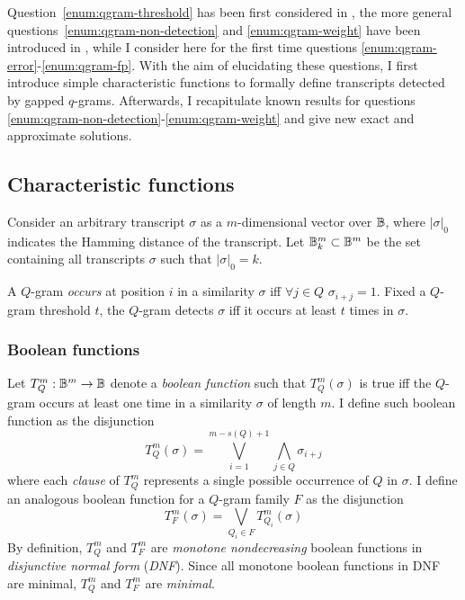 Question~\ref{enum:qgram-threshold} has been first considered in \citep{Burkhardt2001,Kucherov2005},
the more general questions~\ref{enum:qgram-non-detection} and \ref{enum:qgram-weight} have been introduced in \citep{Nicolas2005}, while I consider here for the first time questions \ref{enum:qgram-error}-\ref{enum:qgram-fp}.
With the aim of elucidating these questions, I first introduce simple characteristic functions to formally define transcripts detected by gapped $q$-grams.
Afterwards, I recapitulate known results for questions \ref{enum:qgram-non-detection}-\ref{enum:qgram-weight} and give new exact and approximate solutions.

\subsection{Characteristic functions}

Consider an arbitrary transcript $\sigma$ as a $m$-dimensional vector over $\mathbb {B}$, where $|\sigma|_0$ indicates the Hamming distance of the transcript.
Let $\mathbb {B}^m_k \subset \mathbb {B}^m$ be the set containing all transcripts $\sigma$ such that $|\sigma|_0 = k$.

\begin{definition}
A $Q$-gram \emph{occurs} at position $i$ in a similarity $\sigma$ iff $\forall j \in Q$ $\sigma_{i+j}=1$.
Fixed a $Q$-gram threshold $t$, the $Q$-gram detects $\sigma$ iff it occurs at least $t$ times in $\sigma$.
\end{definition}

\subsubsection{Boolean functions}

Let $T_{Q}^{m}: \mathbb {B}^m \rightarrow \mathbb {B}$ denote a \emph{boolean function} such that $T_{Q}^{m}(\sigma)$ is true iff the $Q$-gram occurs at least one time in a similarity $\sigma$ of length $m$.
I define such boolean function as the disjunction
\begin{equation}
\label{eq:qgram-bool}
T_{Q}^{m}(\sigma) = \bigvee_{i=1}^{m-s(Q)+1} \bigwedge_{j \in Q} \sigma_{i+j}
\end{equation}
where each \emph{clause} of $T_{Q}^{m}$ represents a single possible occurrence of $Q$ in $\sigma$.
I define an analogous boolean function for a $Q$-gram family $F$ as the disjunction
\begin{equation}
\label{eq:family-bool}
T_{F}^{m}(\sigma) = \bigvee_{Q_i \in F} T_{Q_i}^{m}(\sigma)
\end{equation}
By definition, $T_{Q}^{m}$ and $T_{F}^{m}$ are \emph{monotone nondecreasing} boolean functions in \emph{disjunctive normal form} (\emph{DNF}).
Since all monotone boolean functions in DNF are minimal, $T_{Q}^{m}$ and $T_{F}^{m}$ are \emph{minimal}.

